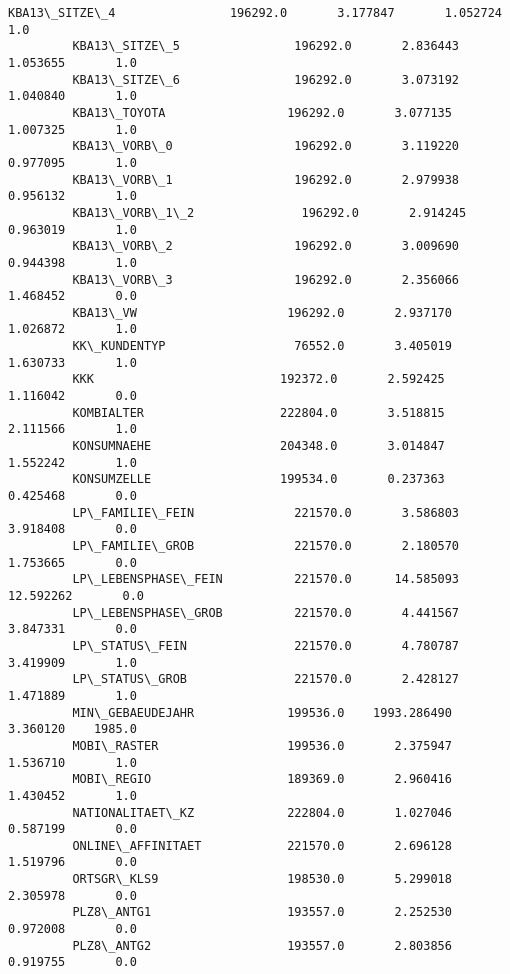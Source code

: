 \documentclass[11pt]{article}
\begin{document}
\begin{Verbatim}[commandchars=\\\{\}]
         KBA13\_SITZE\_4                196292.0       3.177847       1.052724       1.0   
         KBA13\_SITZE\_5                196292.0       2.836443       1.053655       1.0   
         KBA13\_SITZE\_6                196292.0       3.073192       1.040840       1.0   
         KBA13\_TOYOTA                 196292.0       3.077135       1.007325       1.0   
         KBA13\_VORB\_0                 196292.0       3.119220       0.977095       1.0   
         KBA13\_VORB\_1                 196292.0       2.979938       0.956132       1.0   
         KBA13\_VORB\_1\_2               196292.0       2.914245       0.963019       1.0   
         KBA13\_VORB\_2                 196292.0       3.009690       0.944398       1.0   
         KBA13\_VORB\_3                 196292.0       2.356066       1.468452       0.0   
         KBA13\_VW                     196292.0       2.937170       1.026872       1.0   
         KK\_KUNDENTYP                  76552.0       3.405019       1.630733       1.0   
         KKK                          192372.0       2.592425       1.116042       0.0   
         KOMBIALTER                   222804.0       3.518815       2.111566       1.0   
         KONSUMNAEHE                  204348.0       3.014847       1.552242       1.0   
         KONSUMZELLE                  199534.0       0.237363       0.425468       0.0   
         LP\_FAMILIE\_FEIN              221570.0       3.586803       3.918408       0.0   
         LP\_FAMILIE\_GROB              221570.0       2.180570       1.753665       0.0   
         LP\_LEBENSPHASE\_FEIN          221570.0      14.585093      12.592262       0.0   
         LP\_LEBENSPHASE\_GROB          221570.0       4.441567       3.847331       0.0   
         LP\_STATUS\_FEIN               221570.0       4.780787       3.419909       1.0   
         LP\_STATUS\_GROB               221570.0       2.428127       1.471889       1.0   
         MIN\_GEBAEUDEJAHR             199536.0    1993.286490       3.360120    1985.0   
         MOBI\_RASTER                  199536.0       2.375947       1.536710       1.0   
         MOBI\_REGIO                   189369.0       2.960416       1.430452       1.0   
         NATIONALITAET\_KZ             222804.0       1.027046       0.587199       0.0   
         ONLINE\_AFFINITAET            221570.0       2.696128       1.519796       0.0   
         ORTSGR\_KLS9                  198530.0       5.299018       2.305978       0.0   
         PLZ8\_ANTG1                   193557.0       2.252530       0.972008       0.0   
         PLZ8\_ANTG2                   193557.0       2.803856       0.919755       0.0   

\end{Verbatim}
\end{document}
